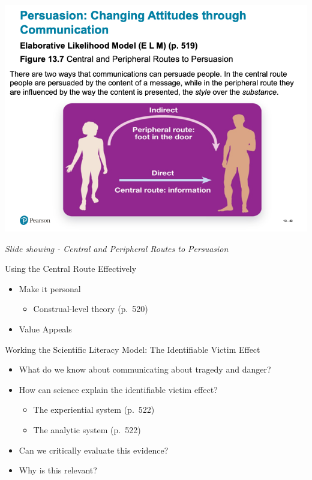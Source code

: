 \documentclass[
]{book}
\providecommand{\tightlist}{%
  \setlength{\itemsep}{0pt}\setlength{\parskip}{0pt}}
\begin{document}
\begin{reflect}
\includegraphics{assets/unit_6/slide_43.png}

\emph{Slide showing - Central and Peripheral Routes to Persuasion}

Using the Central Route Effectively

\begin{itemize}
\tightlist
\item
  Make it personal

  \begin{itemize}
  \tightlist
  \item
    Construal-level theory (p.~520)\\
  \end{itemize}
\item
  Value Appeals
\end{itemize}

Working the Scientific Literacy Model: The Identifiable Victim Effect

\begin{itemize}
\tightlist
\item
  What do we know about communicating about tragedy and danger?
\item
  How can science explain the identifiable victim effect?

  \begin{itemize}
  \tightlist
  \item
    The experiential system (p.~522)\\
  \item
    The analytic system (p.~522)\\
  \end{itemize}
\item
  Can we critically evaluate this evidence?\\
\item
  Why is this relevant?


\end{itemize}
\end{reflect}
\end{document}
